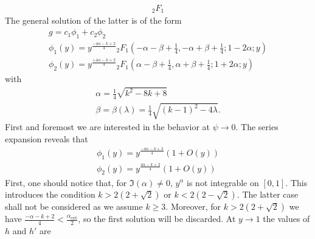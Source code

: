 \documentclass[
a4paper,%
10pt,%
titlepage,%
twoside%
]{article}
\begin{document}
\begin{gather}
  {}_2F_1
\end{gather}
The general solution of the latter is of the form
\begin{gather}
  g=c_1\phi_1+c_2\phi_2\\
  \phi_1(y)=y^{\frac{-4\alpha-k+2}{4}}{}_2F_1 (-\alpha-\beta+\frac{1}{4},-\alpha+\beta+\frac{1}{4};1-2\alpha;y)\\
  \phi_2(y)=y^{\frac{+4\alpha-k+2}{4}}{}_2F_1 (\alpha-\beta+\frac{1}{4},\alpha+\beta+\frac{1}{4};1+2\alpha;y)\label{eq:sol}
\end{gather}
with
\begin{gather}
  \alpha=\frac{1}{4}\sqrt{k^2-8 k+8}\\
  \beta=\beta(\lambda)=\frac{1}{4}\sqrt{(k-1)^2-4\lambda}.
\end{gather}
First and foremost we are interested in the behavior at
$\psi\rightarrow0$. The series expansion reveals that
\begin{gather}
  \phi_1(y)=y^{\frac{-4\alpha-k+2}{4}}(1+O(y))\\
  \phi_2(y)=y^{\frac{4\alpha-k+2}{4}}(1+O(y))
\end{gather}
First, one should notice that, for $\Im(\alpha)\ne0$, $y^\alpha$ is
not integrable on $[0,1]$. This introduces the condition
$k>2(2+\sqrt{2})$ or $k<2(2-\sqrt{2})$. The latter case shall not be
considered as we assume $k\ge3$. Moreover, for $k>2(2+\sqrt{2})$ we
have $\frac{-\alpha-k+2}{4}<\frac{\alpha_{\text{crit}}}{2}$, so the
first solution will be discarded. At $y\rightarrow1$ the values of $h$
and $h'$ are
\end{document}
